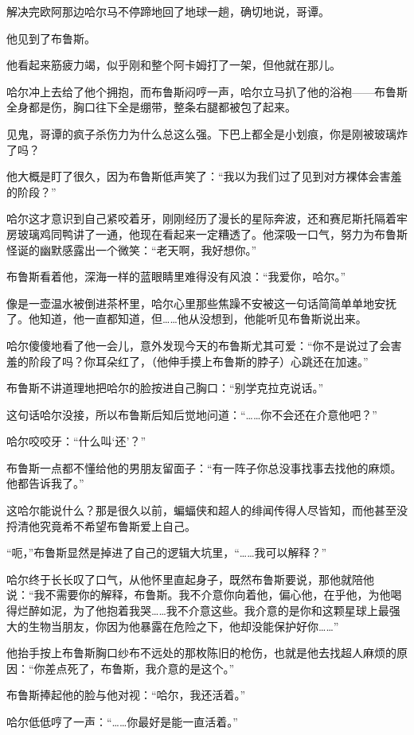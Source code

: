 \documentclass[../main]{subfiles}
\begin{document}
解决完欧阿那边哈尔马不停蹄地回了地球一趟，确切地说，哥谭。

他见到了布鲁斯。

他看起来筋疲力竭，似乎刚和整个阿卡姆打了一架，但他就在那儿。

哈尔冲上去给了他个拥抱，而布鲁斯闷哼一声，哈尔立马扒了他的浴袍——布鲁斯全身都是伤，胸口往下全是绷带，整条右腿都被包了起来。

见鬼，哥谭的疯子杀伤力为什么总这么强。下巴上都全是小划痕，你是刚被玻璃炸了吗？

他大概是盯了很久，因为布鲁斯低声笑了：“我以为我们过了见到对方裸体会害羞的阶段？”

哈尔这才意识到自己紧咬着牙，刚刚经历了漫长的星际奔波，还和赛尼斯托隔着牢房玻璃鸡同鸭讲了一通，他现在看起来一定糟透了。他深吸一口气，努力为布鲁斯怪诞的幽默感露出一个微笑：“老天啊，我好想你。”

布鲁斯看着他，深海一样的蓝眼睛里难得没有风浪：“我爱你，哈尔。”

像是一壶温水被倒进茶杯里，哈尔心里那些焦躁不安被这一句话简简单单地安抚了。他知道，他一直都知道，但……他从没想到，他能听见布鲁斯说出来。

哈尔傻傻地看了他一会儿，意外发现今天的布鲁斯尤其可爱：“你不是说过了会害羞的阶段了吗？你耳朵红了，（他伸手摸上布鲁斯的脖子）心跳还在加速。”

布鲁斯不讲道理地把哈尔的脸按进自己胸口：“别学克拉克说话。”

这句话哈尔没接，所以布鲁斯后知后觉地问道：“……你不会还在介意他吧？”

哈尔咬咬牙：“什么叫‘还’？”

布鲁斯一点都不懂给他的男朋友留面子：“有一阵子你总没事找事去找他的麻烦。他都告诉我了。”

这哈尔能说什么？那是很久以前，蝙蝠侠和超人的绯闻传得人尽皆知，而他甚至没捋清他究竟希不希望布鲁斯爱上自己。

“呃，”布鲁斯显然是掉进了自己的逻辑大坑里，“……我可以解释？”

哈尔终于长长叹了口气，从他怀里直起身子，既然布鲁斯要说，那他就陪他说：“我不需要你的解释，布鲁斯。我不介意你向着他，偏心他，在乎他，为他喝得烂醉如泥，为了他抱着我哭……我不介意这些。我介意的是你和这颗星球上最强大的生物当朋友，你因为他暴露在危险之下，他却没能保护好你……”

他抬手按上布鲁斯胸口纱布不远处的那枚陈旧的枪伤，也就是他去找超人麻烦的原因：“你差点死了，布鲁斯，我介意的是这个。”

布鲁斯捧起他的脸与他对视：“哈尔，我还活着。”

哈尔低低哼了一声：“……你最好是能一直活着。”
\end{document}
